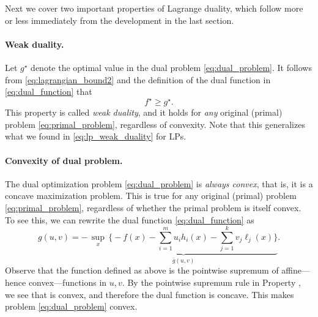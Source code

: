 Next we cover two important properties of Lagrange duality, which follow
more or less immediately from the development in the last section.

\paragraph{Weak duality.}

Let $g^\star$ denote the optimal value in the dual problem
\eqref{eq:dual_problem}. It follows from \eqref{eq:lagrangian_bound2} and the   
definition of the dual function in \eqref{eq:dual_function} that  
\begin{equation}
\label{eq:weak_duality}
f^\star \geq g^\star.
\end{equation}
This property is called \emph{weak duality}, and it holds for \emph{any}
original (primal) problem \eqref{eq:primal_problem}, regardless of
convexity. Note that this generalizes what we found in
\eqref{eq:lp_weak_duality} for LPs. 

\paragraph{Convexity of dual problem.}

The dual optimization problem \eqref{eq:dual_problem} is \emph{always convex},
that is, it is a concave maximization problem. This is true for any original
(primal) problem \eqref{eq:primal_problem}, regardless of whether the primal
problem is itself convex. To see this, we can rewrite the dual function
\eqref{eq:dual_function} as   
\[
g(u,v) = - \, \underbrace{\sup_x \, \bigg\{ -f(x) - \sum_{i=1}^m u_i h_i(x) - 
  \sum_{j=1}^k v_j \ell_j(x) \bigg\}}_{\bar{g}(u,v)}.
\]
Observe that the function defined as  above is the pointwise 
supremum of affine---hence convex---functions in $u,v$. By the pointwise
supremum rule in Property , we see that
 is convex, and therefore the dual function  is concave. This makes problem \eqref{eq:dual_problem} convex.     

\medskip

